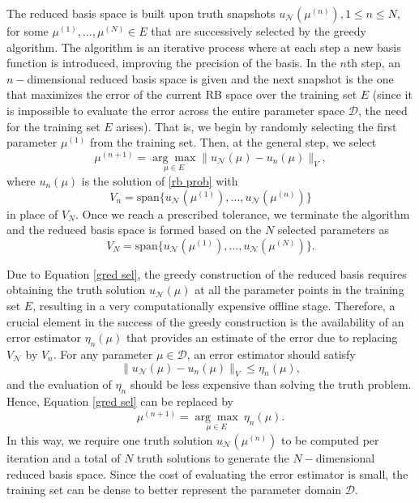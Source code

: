 \documentclass[12pt]{article}
\theoremstyle{remark}
\theoremstyle{definition}
\numberwithin{equation}{section}
\begin{document}
The reduced basis space is built upon truth snapshots $u_{\mathcal{N}}(\mu^{(n)}), 1 \leq n \leq N$, for some $\mu^{(1)},\dots, \mu^{(N)} \in E$ that are successively selected by the greedy algorithm. The algorithm is an iterative process where at each step a new basis function is introduced, improving the precision of the basis. In the $n$th step, an $n-$dimensional reduced basis space is given and the next snapshot is the one that maximizes the error of the current RB space over the training set $E$ (since it is impossible to evaluate the error across the entire parameter space $\mathcal{D}$, the need for the training set $E$ arises). That is, we begin by randomly selecting the first parameter $\mu^{(1)}$ from the training set. Then, at the general step, we select 
\begin{equation}
    \mu^{(n+1)}=\underset{\mu \in E}{\arg \max }  \|u_{\mathcal{N}}(\mu)-u_n(\mu)\|_V,
    \label{gred sel}
\end{equation}
where $u_n(\mu)$ is the solution of \eqref{rb prob} with  
\begin{equation}
    V_{n}= \text{span} \{u_{\mathcal{N}}(\mu^{(1)}),\dots, u_{\mathcal{N}}(\mu^{(n)})\}
\end{equation}
in place of $V_N$. Once we reach a prescribed tolerance, we terminate the algorithm and the reduced basis space is formed based on the $N$ selected parameters as
\begin{equation}
    V_N= \text{span} \{u_{\mathcal{N}}(\mu^{(1)}),\dots, u_{\mathcal{N}}(\mu^{(N)})\}.
\end{equation}

Due to Equation \eqref{gred sel}, the greedy construction of the reduced basis requires obtaining the truth solution $u_{\mathcal{N}}(\mu)$ at all the parameter points in the training set $E$, resulting in a very computationally expensive offline stage. Therefore, a crucial element in the success of the greedy construction is the availability of an error estimator $\eta_n(\mu)$ that provides an estimate of the error due to replacing $V_{\mathcal{N}}$ by $V_{n}$. For any parameter $\mu \in \mathcal{D}$, an error estimator should satisfy
\begin{equation}
    \|u_{\mathcal{N}}(\mu)-u_n(\mu)\|_V\leq \eta_n(\mu),
\end{equation}
and the evaluation of $\eta_n$ should be less expensive than solving the truth problem. Hence, Equation \eqref{gred sel} can be replaced by 
\begin{equation}
    \mu^{(n+1)}=\underset{\mu \in E}{\arg \max } \ \eta_n(\mu).
\end{equation}
In this way, we require one truth solution $u_{\mathcal{N}}(\mu^{(n)})$ to be computed per iteration and a total of $N$ truth solutions to generate the $N-$dimensional reduced basis space. Since the cost of evaluating the error estimator is small, the training set can be dense to better represent the parameter domain $\mathcal{D}$.
\end{document}
